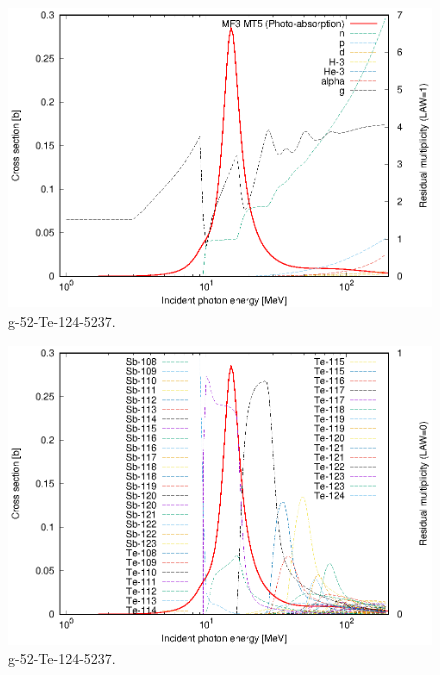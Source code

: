 \begin{figure}
 \includegraphics[width=\linewidth]{eps/g_52-Te-124_5237.eps}
  \caption{g-52-Te-124-5237.}
\end{figure}
\begin{figure}
 \includegraphics[width=\linewidth]{eps-law0/g_52-Te-124_5237.eps}
 \caption{g-52-Te-124-5237.}
\end{figure}
\newpage \clearpage

